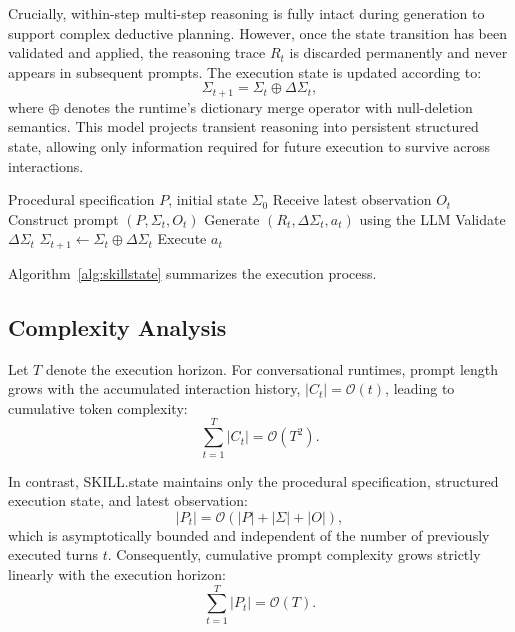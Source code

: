 \documentclass[11pt]{article}
\begin{document}
Crucially, within-step multi-step reasoning is fully intact during generation to support complex deductive planning. However, once the state transition has been validated and applied, the reasoning trace $R_t$ is discarded permanently and never appears in subsequent prompts. The execution state is updated according to:
\begin{equation}
\Sigma_{t+1} = \Sigma_t \oplus \Delta\Sigma_t,
\end{equation}
where $\oplus$ denotes the runtime's dictionary merge operator with null-deletion semantics. This model projects transient reasoning into persistent structured state, allowing only information required for future execution to survive across interactions.

\begin{algorithm}[t]
\caption{SKILL.state Runtime}
\label{alg:skillstate}
\begin{algorithmic}[1]
\Require Procedural specification $P$, initial state $\Sigma_0$
    \State Receive latest observation $O_t$
    \State Construct prompt $(P,\Sigma_t,O_t)$
    \State Generate $(R_t,\Delta\Sigma_t,a_t)$ using the LLM
    \State Validate $\Delta\Sigma_t$
    \State $\Sigma_{t+1}\leftarrow\Sigma_t\oplus\Delta\Sigma_t$
    \State Execute $a_t$
\EndFor
\end{algorithmic}
\end{algorithm}

Algorithm~\ref{alg:skillstate} summarizes the execution process.

\subsection{Complexity Analysis}
\label{subsec:complexity}

Let $T$ denote the execution horizon. For conversational runtimes, prompt length grows with the accumulated interaction history, $|C_t|=\mathcal{O}(t)$, leading to cumulative token complexity:
\begin{equation}
\sum_{t=1}^{T}|C_t| = \mathcal{O}(T^2).
\end{equation}

In contrast, SKILL.state maintains only the procedural specification, structured execution state, and latest observation:
\begin{equation}
|P_t| = \mathcal{O}(|P|+|\Sigma|+|O|),
\end{equation}
which is asymptotically bounded and independent of the number of previously executed turns $t$. Consequently, cumulative prompt complexity grows strictly linearly with the execution horizon:
\begin{equation}
\sum_{t=1}^{T}|P_t| = \mathcal{O}(T).
\end{equation}
\end{document}
